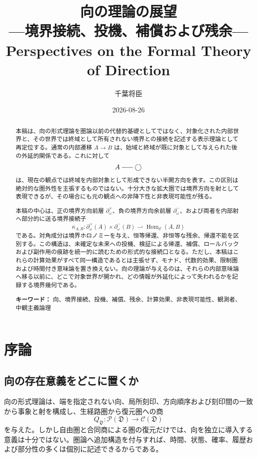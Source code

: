\documentclass[a4paper,11pt]{ltjsarticle}
\title{向の理論の展望\\[0.2em]
  {\Large ---境界接続、投機、補償および残余---}\\[0.4em]
  {\large Perspectives on the Formal Theory of Direction}}
\author{千葉将臣}
\date{2026-08-26}
\theoremstyle{definition}
\theoremstyle{plain}
\newcommand{\Hom}{\operatorname{Hom}}
\newcommand{\dfix}{\bigcirc}
\newcommand{\dline}{\mathrel{\rule[0.55ex]{1.6em}{0.4pt}}}
\begin{document}
\maketitle

\begin{abstract}
本稿は、向の形式理論を圏論以前の代替的基礎としてではなく、対象化された内部世界と、その世界では終域として所有されない境界との接続を記述する表示理論として再定位する。通常の内部遷移 $A\to B$ は、始域と終域が既に対象として与えられた後の外延的関係である。これに対して
\[
 A\dline\dfix
\]
は、現在の観点では終域を内部対象として形成できない半開方向を表す。この区別は絶対的な圏外性を主張するものではない。十分大きな拡大圏では境界方向を射として表現できるが、その場合にも元の観点への非降下性と非表現可能性が残る。

本稿の中心は、正の境界方向前層 $\partial_\omega^+$、負の境界方向余前層 $\partial_\omega^-$、および両者を内部射へ部分的に送る境界接続子
\[
 \kappa_{A,B}:
 \partial_\omega^+(A)\times\partial_\omega^-(B)
 \rightharpoonup
 \Hom_{\mathcal C}(A,B)
\]
である。対角成分は境界ホロノミーを与え、恒等帰還、非恒等な残余、帰還不能を区別する。この構造は、未確定な未来への投機、検証による帰還、補償、ロールバックおよび副作用の痕跡を統一的に読むための形式的な接続口となる。ただし、本稿はこれらの計算効果がすべて同一構造であるとは主張せず、モナド、代数的効果、限制圏および時間付き意味論を置き換えない。向の理論が与えるのは、それらの内部意味論へ移る以前に、どこで対象世界が開かれ、どの情報が外延化によって失われるかを記録する境界幾何である。

\medskip
\noindent\textbf{キーワード：} 向、境界接続、投機、補償、残余、計算効果、非表現可能性、観測者、中観主義論理
\end{abstract}

\tableofcontents

\section{序論}

\subsection{向の存在意義をどこに置くか}

向の形式理論は、端を指定されない向、局所刻印、方向順序および刻印間の一致から事象と射を構成し、生経路圏から復元圏への商
\[
 Q_{\mathfrak D}:
 \mathcal P(\mathfrak D)\longrightarrow
 \mathcal C(\mathfrak D)
\]
を与えた\cite{ChibaDirection2026}。しかし自由圏と合同商による圏の復元だけでは、向を独立に導入する意義は十分ではない。圏論へ追加構造を付与すれば、時間、状態、確率、履歴および部分性の多くは個別に記述できるからである。
\end{document}
